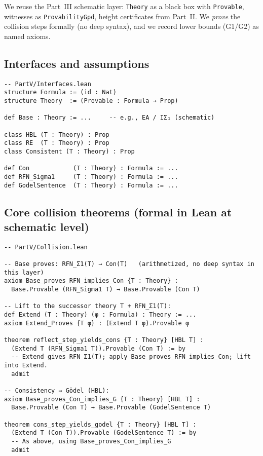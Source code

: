 \documentclass[11pt]{article}
\theoremstyle{definition}
\theoremstyle{remark}
\begin{document}
We reuse the Part~III schematic layer: \texttt{Theory} as a black box with \texttt{Provable}, witnesses as \texttt{ProvabilityGpd}, height certificates from Part~II. We \emph{prove} the collision steps formally (no deep syntax), and we record lower bounds (G1/G2) as named axioms.

\subsection*{Interfaces and assumptions}
\begin{verbatim}
-- PartV/Interfaces.lean
structure Formula := (id : Nat)
structure Theory  := (Provable : Formula → Prop)

def Base : Theory := ...     -- e.g., EA / IΣ₁ (schematic)

class HBL (T : Theory) : Prop
class RE  (T : Theory) : Prop
class Consistent (T : Theory) : Prop

def Con            (T : Theory) : Formula := ...
def RFN_Sigma1     (T : Theory) : Formula := ...
def GodelSentence  (T : Theory) : Formula := ...
\end{verbatim}

\subsection*{Core collision theorems (formal in Lean at schematic level)}
\begin{verbatim}
-- PartV/Collision.lean

-- Base proves: RFN_Σ1(T) → Con(T)   (arithmetized, no deep syntax in this layer)
axiom Base_proves_RFN_implies_Con {T : Theory} :
  Base.Provable (RFN_Sigma1 T) → Base.Provable (Con T)

-- Lift to the successor theory T + RFN_Σ1(T):
def Extend (T : Theory) (φ : Formula) : Theory := ...
axiom Extend_Proves {T φ} : (Extend T φ).Provable φ

theorem reflect_step_yields_cons {T : Theory} [HBL T] :
  (Extend T (RFN_Sigma1 T)).Provable (Con T) := by
  -- Extend gives RFN_Σ1(T); apply Base_proves_RFN_implies_Con; lift into Extend.
  admit

-- Consistency ⇒ Gödel (HBL):
axiom Base_proves_Con_implies_G {T : Theory} [HBL T] :
  Base.Provable (Con T) → Base.Provable (GodelSentence T)

theorem cons_step_yields_godel {T : Theory} [HBL T] :
  (Extend T (Con T)).Provable (GodelSentence T) := by
  -- As above, using Base_proves_Con_implies_G
  admit
\end{verbatim}
\end{document}
